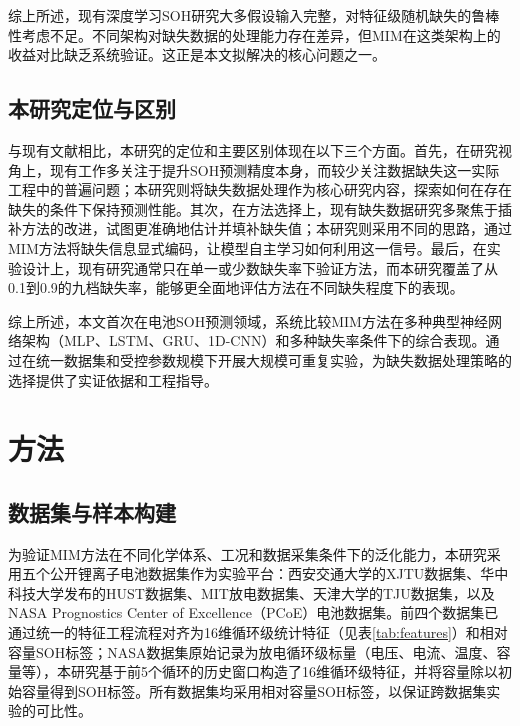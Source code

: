 \documentclass[10pt,a4paper]{ctexart}
\begin{document}
综上所述，现有深度学习SOH研究大多假设输入完整，对特征级随机缺失的鲁棒性考虑不足。不同架构对缺失数据的处理能力存在差异，但MIM在这类架构上的收益对比缺乏系统验证。这正是本文拟解决的核心问题之一。

\subsection{本研究定位与区别}

与现有文献相比，本研究的定位和主要区别体现在以下三个方面。首先，在研究视角上，现有工作多关注于提升SOH预测精度本身，而较少关注数据缺失这一实际工程中的普遍问题；本研究则将缺失数据处理作为核心研究内容，探索如何在存在缺失的条件下保持预测性能。其次，在方法选择上，现有缺失数据研究多聚焦于插补方法的改进，试图更准确地估计并填补缺失值；本研究则采用不同的思路，通过MIM方法将缺失信息显式编码，让模型自主学习如何利用这一信号。最后，在实验设计上，现有研究通常只在单一或少数缺失率下验证方法，而本研究覆盖了从0.1到0.9的九档缺失率，能够更全面地评估方法在不同缺失程度下的表现。

综上所述，本文首次在电池SOH预测领域，系统比较MIM方法在多种典型神经网络架构（MLP、LSTM、GRU、1D-CNN）和多种缺失率条件下的综合表现。通过在统一数据集和受控参数规模下开展大规模可重复实验，为缺失数据处理策略的选择提供了实证依据和工程指导。


\section{方法}\label{sec:method}

\subsection{数据集与样本构建}

为验证MIM方法在不同化学体系、工况和数据采集条件下的泛化能力，本研究采用五个公开锂离子电池数据集作为实验平台：西安交通大学的XJTU数据集\cite{wang2024open,duan2025lithium}、华中科技大学发布的HUST数据集、MIT放电数据集\cite{sequura2016comparison}、天津大学的TJU数据集，以及NASA Prognostics Center of Excellence（PCoE）电池数据集\cite{saha2007battery}。前四个数据集已通过统一的特征工程流程对齐为16维循环级统计特征（见表\ref{tab:features}）和相对容量SOH标签；NASA数据集原始记录为放电循环级标量（电压、电流、温度、容量等），本研究基于前5个循环的历史窗口构造了16维循环级特征，并将容量除以初始容量得到SOH标签。所有数据集均采用相对容量SOH标签，以保证跨数据集实验的可比性。
\end{document}

